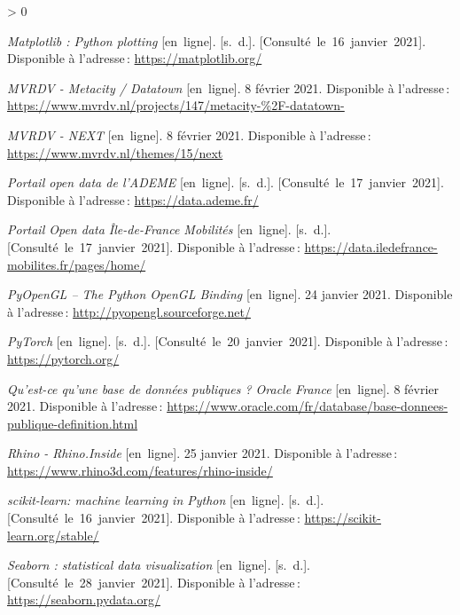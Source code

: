 \documentclass[
  11pt,
  french,
]{article}
\newlength{\cslhangindent}
\newenvironment{CSLReferences}[2] %
 {%
  \setlength{\parindent}{0pt}
  \ifodd #1 \everypar{\setlength{\hangindent}{\cslhangindent}}\ignorespaces\fi
  \ifnum #2 > 0
  \setlength{\parskip}{#2\baselineskip}
  \fi
 }%
 {}
\begin{document}
\begin{CSLReferences}{0}{0}
\leavevmode\hypertarget{ref-matplotlib}{}%
\emph{Matplotlib : Python plotting} {[}en~ligne{]}. {[}s.~d.{]}.
{[}Consulté~le~16~janvier~2021{]}. Disponible à l'adresse\,:
\url{https://matplotlib.org/}

\leavevmode\hypertarget{ref-metacity}{}%
\emph{MVRDV - Metacity / Datatown} {[}en~ligne{]}. 8 février 2021.
Disponible à l'adresse\,:
\url{https://www.mvrdv.nl/projects/147/metacity-\%2F-datatown-}

\leavevmode\hypertarget{ref-mvrdv}{}%
\emph{MVRDV - NEXT} {[}en~ligne{]}. 8 février 2021. Disponible à
l'adresse\,: \url{https://www.mvrdv.nl/themes/15/next}

\leavevmode\hypertarget{ref-ademe}{}%
\emph{Portail open data de l'ADEME} {[}en~ligne{]}. {[}s.~d.{]}.
{[}Consulté~le~17~janvier~2021{]}. Disponible à l'adresse\,:
\url{https://data.ademe.fr/}

\leavevmode\hypertarget{ref-idfmobi}{}%
\emph{Portail Open data Île-de-France Mobilités} {[}en~ligne{]}.
{[}s.~d.{]}. {[}Consulté~le~17~janvier~2021{]}. Disponible à
l'adresse\,: \url{https://data.iledefrance-mobilites.fr/pages/home/}

\leavevmode\hypertarget{ref-pyopengl}{}%
\emph{PyOpenGL -- The Python OpenGL Binding} {[}en~ligne{]}. 24 janvier
2021. Disponible à l'adresse\,: \url{http://pyopengl.sourceforge.net/}

\leavevmode\hypertarget{ref-pytorch}{}%
\emph{PyTorch} {[}en~ligne{]}. {[}s.~d.{]}.
{[}Consulté~le~20~janvier~2021{]}. Disponible à l'adresse\,:
\url{https://pytorch.org/}

\leavevmode\hypertarget{ref-oracle}{}%
\emph{Qu'est-ce qu'une base de données publiques ? \textbar{} Oracle
France} {[}en~ligne{]}. 8 février 2021. Disponible à l'adresse\,:
\url{https://www.oracle.com/fr/database/base-donnees-publique-definition.html}

\leavevmode\hypertarget{ref-rhinoinside}{}%
\emph{Rhino - Rhino.Inside} {[}en~ligne{]}. 25 janvier 2021. Disponible
à l'adresse\,: \url{https://www.rhino3d.com/features/rhino-inside/}

\leavevmode\hypertarget{ref-sklearn}{}%
\emph{scikit-learn: machine learning in Python} {[}en~ligne{]}.
{[}s.~d.{]}. {[}Consulté~le~16~janvier~2021{]}. Disponible à
l'adresse\,: \url{https://scikit-learn.org/stable/}

\leavevmode\hypertarget{ref-seaborn}{}%
\emph{Seaborn : statistical data visualization} {[}en~ligne{]}.
{[}s.~d.{]}. {[}Consulté~le~28~janvier~2021{]}. Disponible à
l'adresse\,: \url{https://seaborn.pydata.org/}


\end{CSLReferences}
\end{document}
